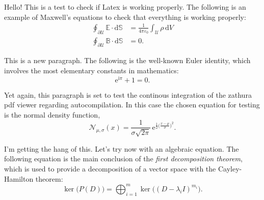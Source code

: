 \documentclass{article}
\begin{document}
Hello! This is a test to check if Latex is working properly. The following is
an example of Maxwell's equations to check that everything is working properly:
\begin{align}
    \oint_{\partial \mathcal{U}} \mathbb{E} \cdot \mathrm{d} \mathbb{S} &= \frac{1}{4 \pi \varepsilon_0}
    \int_{\mathcal{U}} \rho \, \mathrm{d} V \\
    \oint_{\partial \mathcal{U}} \mathbb{B} \cdot \mathrm{d} \mathbb{S} &= 0.
\end{align}

This is a new paragraph. The following is the well-known Euler identity, which
involves the most elementary constants in mathematics:
\begin{equation}
    \mathrm{e}^{\mathrm{i} \pi} + 1 = 0.
\end{equation}

Yet again, this paragraph is set to test the continous integration of the
zathura pdf viewer regarding autocompilation. In this case the chosen equation 
for testing is the normal density function,
\begin{equation}
    \mathcal{N}_{\mu, \sigma}(x) = \frac{1}{\sigma \sqrt{2 \pi}} \, \mathrm{e}^{\frac{1}{2} \big( \frac{x - \mu}{\sigma} \big)^2}.
\end{equation}

I'm getting the hang of this. Let's try now with an algebraic equation. The
following equation is the main conclusion of the \emph{first decomposition
theorem}, which is used to provide a decomposition of a vector space with the
Cayley-Hamilton theorem:
\begin{equation}
    \ker\big( P(D) \big) = \bigoplus_{i = 1}^{m} \ker \big( (D - \lambda_{i} I)^{m_i} \big).
\end{equation}
\end{document}

